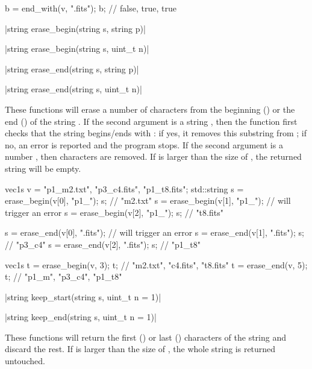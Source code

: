 {\begin{example}
\begin{cppcode}
b = end_with(v, ".fits");
b; // {false, true, true}
\end{cppcode}
\end{example}

\funcitem \vectorfunc \cppinline|string erase_begin(string s, string p)| 

\vectorfunc \cppinline|string erase_begin(string s, uint_t n)|

\vectorfunc \cppinline|string erase_end(string s, string p)| 

\vectorfunc \cppinline|string erase_end(string s, uint_t n)|

These functions will erase a number of characters from the beginning () or the end () of the string . If the second argument is a string , then the function first checks that the string begins/ends with : if yes, it removes this substring from ; if no, an error is reported and the program stops. If the second argument is a number , then  characters are removed. If  is larger than the size of , the returned string will be empty.

\begin{example}
\begin{cppcode}
vec1s v = {"p1_m2.txt", "p3_c4.fits", "p1_t8.fits"};
std::string s = erase_begin(v[0], "p1_");
s; // "m2.txt"
s = erase_begin(v[1], "p1_");
// will trigger an error
s = erase_begin(v[2], "p1_");
s; // "t8.fits"

s = erase_end(v[0], ".fits");
// will trigger an error
s = erase_end(v[1], ".fits");
s; // "p3_c4"
s = erase_end(v[2], ".fits");
s; // "p1_t8"

vec1s t = erase_begin(v, 3);
t; // {"m2.txt", "c4.fits", "t8.fits"}
t = erase_end(v, 5);
t; // {"p1_m", "p3_c4", "p1_t8"}
\end{cppcode}
\end{example}

\funcitem \vectorfunc \cppinline|string keep_start(string s, uint_t n = 1)| 

\vectorfunc \cppinline|string keep_end(string s, uint_t n = 1)| 

These functions will return the first () or last ()  characters of the string  and discard the rest. If  is larger than the size of , the whole string is returned untouched.

}
